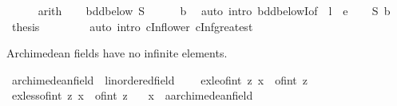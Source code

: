 \begin{isabellebody}
\ \ \ \ \isamarkupfalse%
\ arith\isanewline
\ \ \isamarkupfalse%
\ {\isachardoublequoteopen}bdd{\isacharunderscore}{\kern0pt}below\ S{\isachardoublequoteclose}\isanewline
\ \ \ \ \isamarkupfalse%
\ b\ \isamarkupfalse%
\ {\isacharparenleft}{\kern0pt}auto\ intro{\isacharbang}{\kern0pt}{\isacharcolon}{\kern0pt}\ bdd{\isacharunderscore}{\kern0pt}belowI{\isacharbrackleft}{\kern0pt}of\ {\isacharunderscore}{\kern0pt}\ {\isachardoublequoteopen}l\ {\isacharminus}{\kern0pt}\ e{\isachardoublequoteclose}{\isacharbrackright}{\kern0pt}{\isacharparenright}{\kern0pt}\isanewline
\ \ \isamarkupfalse%
\ S\ b\ \isamarkupfalse%
\ {\isacharquery}{\kern0pt}thesis\isanewline
\ \ \ \ \isamarkupfalse%
\ {\isacharasterisk}{\kern0pt}\ \isamarkupfalse%
\ {\isacharparenleft}{\kern0pt}auto\ intro{\isacharbang}{\kern0pt}{\isacharcolon}{\kern0pt}\ cInf{\isacharunderscore}{\kern0pt}lower{}\ cInf{\isacharunderscore}{\kern0pt}greatest{\isacharparenright}{\kern0pt}\isanewline
{}\isamarkupfalse%
%
\endisatagproof
{\isafoldproof}%
%
\isadelimproof
%
\endisadelimproof
%
\isadelimdocument
%
\endisadelimdocument
%
\isatagdocument
%
\isamarkuptrue%
%
\endisatagdocument
{\isafolddocument}%
%
\isadelimdocument
%
\endisadelimdocument
%
\begin{isamarkuptext}%
Archimedean fields have no infinite elements.%
\end{isamarkuptext}\isamarkuptrue%
\isamarkupfalse%
\ archimedean{\isacharunderscore}{\kern0pt}field\ {\isacharequal}{\kern0pt}\ linordered{\isacharunderscore}{\kern0pt}field\ {\isacharplus}{\kern0pt}\isanewline
\ \ \ ex{\isacharunderscore}{\kern0pt}le{\isacharunderscore}{\kern0pt}of{\isacharunderscore}{\kern0pt}int{\isacharcolon}{\kern0pt}\ {\isachardoublequoteopen}{\isasymexists}z{\isachardot}{\kern0pt}\ x\ {\isasymle}\ of{\isacharunderscore}{\kern0pt}int\ z{\isachardoublequoteclose}\isanewline
\isanewline
{}\isamarkupfalse%
\ ex{\isacharunderscore}{\kern0pt}less{\isacharunderscore}{\kern0pt}of{\isacharunderscore}{\kern0pt}int{\isacharcolon}{\kern0pt}\ {\isachardoublequoteopen}{\isasymexists}z{\isachardot}{\kern0pt}\ x\ {\isacharless}{\kern0pt}\ of{\isacharunderscore}{\kern0pt}int\ z{\isachardoublequoteclose}\isanewline
\ \ \ x\ {\isacharcolon}{\kern0pt}{\isacharcolon}{\kern0pt}\ {\isachardoublequoteopen}{\isacharprime}{\kern0pt}a{\isacharcolon}{\kern0pt}{\isacharcolon}{\kern0pt}archimedean{\isacharunderscore}{\kern0pt}field{\isachardoublequoteclose}\isanewline

\end{isabellebody}
